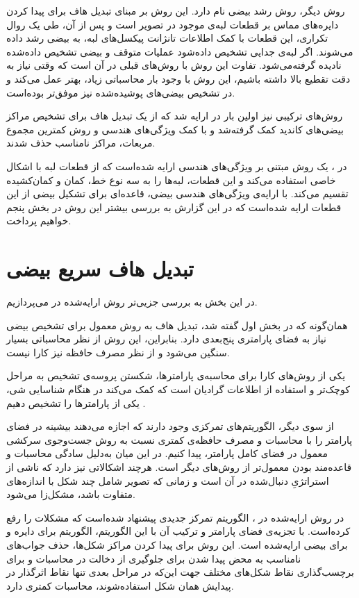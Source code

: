 \documentclass[12pt,a4paper]{article}
\numberwithin{equation}{section}
\numberwithin{figure}{section}
\theoremstyle{definition}
\theoremstyle{theorem}
\theoremstyle{definition}
\begin{document}
روش دیگر، روش رشد بیضی\cite{grow} نام دارد. این روش بر مبنای تبدیل هاف برای پیدا کردن دایره‌های مماس بر قطعات لبه‌ی موجود در تصویر است و پس از آن، طی یک روال تکراری، این قطعات با کمک اطلاعات تانژانت پیکسل‌های لبه، به بیضی رشد داده می‌شوند. اگر لبه‌ی جدایی تشخیص داده‌شود عملیات متوقف و بیضی تشخیص داده‌شده نادیده گرفته‌می‌شود. تفاوت این روش با روش‌های قبلی در آن است که وقتی نیاز به دقت تقطیع بالا داشته باشیم، این روش با وجود بار محاسباتی زیاد، بهتر عمل می‌کند و در تشخیص بیضی‌های پوشیده‌شده نیز موفق‌تر بوده‌است. 

روش‌های ترکیبی نیز اولین بار در \cite{comb} ارایه شد که از یک تبدیل هاف برای تشخیص مراکز بیضی‌های کاندید کمک گرفته‌شد و با کمک ویژگی‌های هندسی و روش کمترین مجموع مربعات، مراکز نامناسب حذف شدند. 


در \cite{geo}، یک روش مبتنی بر ویژگی‌های هندسی ارایه شده‌است که از قطعات لبه با اشکال خاصی استفاده می‌کند و این قطعات، لبه‌ها را به سه نوع خط، کمان و کمان‌کشیده تقسیم می‌کند. با ارایه‌ی ویژگی‌های هندسی بیضی، قاعده‌ای برای تشکیل بیضی از این قطعات ارایه شده‌است که در این گزارش به بررسی بیشتر این روش در بخش پنجم خواهیم پرداخت.

\newpage

\section{تبدیل هاف سریع بیضی }

در این بخش به بررسی جزیی‌تر روش ارایه‌شده در \cite{FEHT} می‌پردازیم. 

همان‌گونه که در بخش اول گفته شد، تبدیل هاف به روش معمول برای تشخیص بیضی نیاز به فضای پارامتری پنج‌بعدی دارد. بنابراین، این روش از نظر محاسباتی بسیار سنگین می‌شود و از نظر مصرف حافظه نیز کارا نیست. 

یکی از روش‌های کارا برای محاسبه‌ی پارامترها،‌ شکستن پروسه‌ی تشخیص به مراحل کوچک‌تر و استفاده از اطلاعات گرادیان است که کمک می‌کند در هنگام شناسایی شی، یکی از پارامترها را تشخیص دهیم \cite{decompose}. 

از سوی دیگر، الگوریتم‌های تمرکزی وجود دارند که اجازه می‌دهند بیشینه در فضای پارامتر را با محاسبات و مصرف حافظه‌ی کمتری نسبت به روش جست‌وجوی سرکشی معمول در فضای کامل پارامتر، پیدا کنیم\cite{FHT}. در این میان  به‌دلیل سادگی محاسبات و قاعده‌مند بودن معمول‌تر از روش‌های دیگر است. هرچند اشکالاتی نیز دارد که ناشی از استراتژیِ دنبال‌شده در آن است و زمانی که تصویر شامل چند شکل با اندازه‌های متفاوت باشد، مشکل‌زا می‌شود. 

در روش ارایه‌شده در \cite{FEHT}، الگوریتم تمرکز جدیدی پیشنهاد شده‌است که مشکلات  را رفع کرده‌است. با تجزیه‌ی فضای پارامتر و ترکیب آن با این الگوریتم، الگوریتم  برای دایره و  برای بیضی ارایه‌شده است. این روش برای پیدا کردن مراکز شکل‌ها، حذف جواب‌های نامناسب به محض پیدا شدن برای جلوگیری از دخالت در محاسبات و برای برچسب‌گذاری نقاط شکل‌های مختلف جهت این‌که در مراحل بعدی تنها نقاط اثرگذار در پیدایش همان شکل استفاده‌‌شوند، محاسبات کمتری دارد. 
\end{document}
